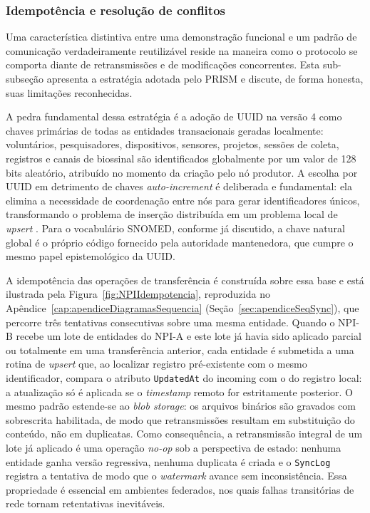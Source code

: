 \subsubsection{Idempotência e resolução de conflitos}

Uma característica distintiva entre uma demonstração funcional e um padrão de comunicação verdadeiramente reutilizável reside na maneira como o protocolo se comporta diante de retransmissões e de modificações concorrentes. Esta sub-subseção apresenta a estratégia adotada pelo PRISM e discute, de forma honesta, suas limitações reconhecidas.

A pedra fundamental dessa estratégia é a adoção de UUID na versão 4 como chaves primárias de todas as entidades transacionais geradas localmente: voluntários, pesquisadores, dispositivos, sensores, projetos, sessões de coleta, registros e canais de biossinal são identificados globalmente por um valor de 128 bits aleatório, atribuído no momento da criação pelo nó produtor. A escolha por UUID em detrimento de chaves \textit{auto-increment} é deliberada e fundamental: ela elimina a necessidade de coordenação entre nós para gerar identificadores únicos, transformando o problema de inserção distribuída em um problema local de \textit{upsert} \cite{kleppmann2017designing, vogels2009eventually}. Para o vocabulário SNOMED, conforme já discutido, a chave natural global é o próprio código fornecido pela autoridade mantenedora, que cumpre o mesmo papel epistemológico da UUID.

A idempotência das operações de transferência é construída sobre essa base e está ilustrada pela Figura~\ref{fig:NPIIdempotencia}, reproduzida no Apêndice~\ref{cap:apendiceDiagramasSequencia} (Seção~\ref{sec:apendiceSeqSync}), que percorre três tentativas consecutivas sobre uma mesma entidade. Quando o NPI-B recebe um lote de entidades do NPI-A e este lote já havia sido aplicado parcial ou totalmente em uma transferência anterior, cada entidade é submetida a uma rotina de \textit{upsert} que, ao localizar registro pré-existente com o mesmo identificador, compara o atributo \texttt{UpdatedAt} do incoming com o do registro local: a atualização só é aplicada se o \textit{timestamp} remoto for estritamente posterior. O mesmo padrão estende-se ao \textit{blob storage}: os arquivos binários são gravados com sobrescrita habilitada, de modo que retransmissões resultam em substituição do conteúdo, não em duplicatas. Como consequência, a retransmissão integral de um lote já aplicado é uma operação \textit{no-op} sob a perspectiva de estado: nenhuma entidade ganha versão regressiva, nenhuma duplicata é criada e o \texttt{SyncLog} registra a tentativa de modo que o \textit{watermark} avance sem inconsistência. Essa propriedade é essencial em ambientes federados, nos quais falhas transitórias de rede tornam retentativas inevitáveis.

